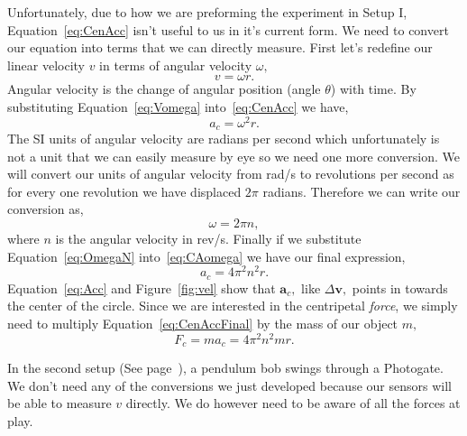 \documentclass[main.tex]{subfiles}
\begin{document}
Unfortunately, due to how we are preforming the experiment in Setup I, Equation~\eqref{eq:CenAcc} isn't useful to us in it's current form. We need to convert our equation into terms that we can directly measure. First let's redefine our linear velocity $v$ in terms of angular velocity $\omega,$
\begin{equation}\label{eq:Vomega}
v=\omega r.
\end{equation}
Angular velocity is the change of angular position (angle $\theta$) with time. By substituting Equation~\eqref{eq:Vomega} into~\eqref{eq:CenAcc} we have,
\begin{equation}\label{eq:CAomega}
a_c=\omega^2r.
\end{equation}
The SI units of angular velocity are radians per second which unfortunately is not a unit that we can easily measure by eye so we need one more conversion. We will convert our units of angular velocity from rad/s to revolutions per second as for every one revolution we have displaced $2\pi$ radians. Therefore we can write our conversion as,
\begin{equation}\label{eq:OmegaN}
\omega = 2\pi n,
\end{equation}
where $n$ is the angular velocity in rev/s. Finally if we substitute Equation~\eqref{eq:OmegaN} into~\eqref{eq:CAomega} we have our final expression,
\begin{equation}\label{eq:CenAccFinal}
a_c=4\pi^2n^2r.
\end{equation}
Equation~\eqref{eq:Acc} and Figure~\ref{fig:vel} show that $\mathbf{a}_c,$ like $\Delta\mathbf{v},$ points in towards the center of the circle. Since we are interested in the centripetal \emph{force}, we simply need to multiply Equation~\eqref{eq:CenAccFinal} by the mass of our object $m,$
\begin{equation}\label{eq:CenForce1}
F_c=ma_c=4\pi^2n^2mr.
\end{equation}

In the second setup (See page~\pageref{page:CenForce_1_Setup}), a pendulum bob swings through a Photogate. We don't need any of the conversions we just developed because our sensors will be able to measure $v$ directly. We do however need to be aware of all the forces at play.
\end{document}
